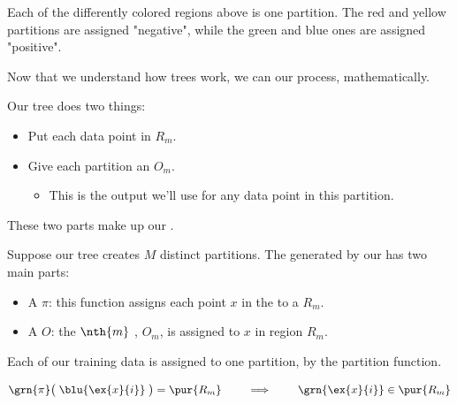         \miniex Each of the differently colored regions above is one partition. The red and yellow partitions are assigned "negative", while the green and blue ones are assigned "positive".


        Now that we understand how trees work, we can  our process, mathematically.

        Our tree does two things:

        \begin{itemize}
            \item Put each data point in  $R_m$. 

            \item Give each partition an  $O_m$.
            
            \begin{itemize}
                \item This is the output we'll use for any data point in this partition.
            \end{itemize}
        \end{itemize}

        These two parts make up our .\\

        \begin{definition}
            Suppose our tree creates $M$ distinct partitions. The  generated by our  has two main parts:

            \begin{itemize}
                \item A  $\pi$: this function assigns each point $x$ in the  to a  $R_m$.

                \item A  $O$: the $\nth{m}$ , $O_m$, is assigned to  $x$ in region $R_m$.
            \end{itemize}
        \end{definition}

        Each of our training data is assigned to one partition, by the partition function.

        \begin{equation}
            \grn{\pi} \big(  \; \blu{\ex{x}{i}} \; \big)=\pur{R_m} \qquad \implies \qquad \grn{\ex{x}{i}} \in \pur{R_m}
        \end{equation}

